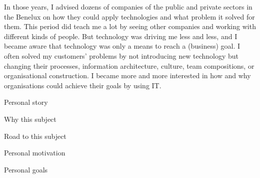In those years, I advised dozens of companies of the public and private sectors in the Benelux on how they could apply technologies and what problem it solved for them. This period did teach me a lot by seeing other companies and working with different kinds of people. But technology was driving me less and less, and I became aware that technology was only a means to reach a (business) goal. I often solved my customers' problems by not introducing new technology but changing their processes, information architecture, culture, team compositions, or organisational construction. I became more and more interested in how and why organisations could achieve their goals by using IT.


Personal story

Why this subject

Road to this subject

Personal motivation

Personal goals